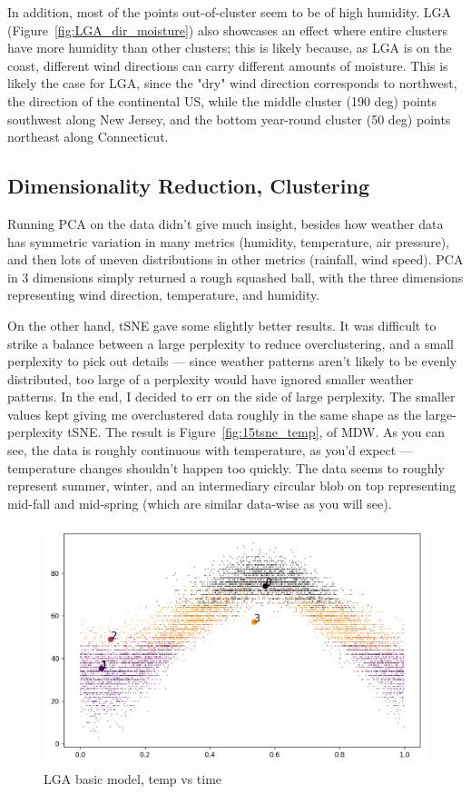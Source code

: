 \documentclass[a4paper]{article}
\begin{document}
In addition, most of the points out-of-cluster seem to be of high humidity. LGA (Figure~\ref{fig:LGA_dir_moisture}) also showcases an effect where entire clusters have more humidity than other clusters; this is likely because, as LGA is on the coast, different wind directions can carry different amounts of moisture. This is likely the case for LGA, since the "dry" wind direction corresponds to northwest, the direction of the continental US, while the middle cluster (190 deg) points southwest along New Jersey, and the bottom year-round cluster (50 deg) points northeast along Connecticut. 


\subsection{Dimensionality Reduction, Clustering}

Running PCA on the data didn't give much insight, besides how weather data has symmetric variation in many metrics (humidity, temperature, air pressure), and then lots of uneven distributions in other metrics (rainfall, wind speed).\cite{pca} PCA in 3 dimensions simply returned a rough squashed ball, with the three dimensions representing wind direction, temperature, and humidity.

On the other hand, tSNE gave some slightly better results. It was difficult to strike a balance between a large perplexity to reduce overclustering, and a small perplexity to pick out details --- since weather patterns aren't likely to be evenly distributed, too large of a perplexity would have ignored smaller weather patterns.\cite{tsne} In the end, I decided to err on the side of large perplexity. The smaller values kept giving me overclustered data roughly in the same shape as the large-perplexity tSNE. The result is Figure~\ref{fig:15tsne_temp}, of MDW. As you can see, the data is roughly continuous with temperature, as you'd expect --- temperature changes shouldn't happen too quickly. The data seems to roughly represent summer, winter, and an intermediary circular blob on top representing mid-fall and mid-spring (which are similar data-wise as you will see). 


\begin{figure}[t]
  \centering
  \includegraphics[width=\linewidth]{../png/models/LGA-basic-temperature4.png}
  \caption{LGA basic model, temp vs time}
  \label{fig:LGA_basics}
\end{figure}
\end{document}

